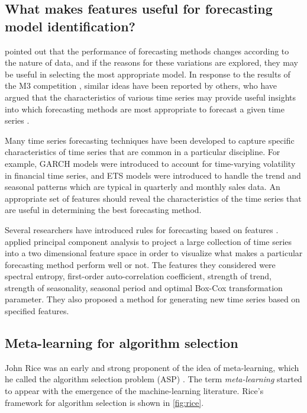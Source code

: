 \documentclass[11pt,a4paper,]{article}
\theoremstyle{definition}
\theoremstyle{definition}
\theoremstyle{definition}
\theoremstyle{remark}
\begin{document}
\subsection{What makes features useful for forecasting model
identification?}\label{what-makes-features-useful-for-forecasting-model-identification}

\textcite{reid1972comparison} pointed out that the performance of
forecasting methods changes according to the nature of data, and if the
reasons for these variations are explored, they may be useful in
selecting the most appropriate model. In response to the results of the
M3 competition \autocite{makridakis2000m3}, similar ideas have been
reported by others, who have argued that the characteristics of various
time series may provide useful insights into which forecasting methods
are most appropriate to forecast a given time series
\autocites{hyndman2001s}{lawrence2001s}{armstrong2001s}.

Many time series forecasting techniques have been developed to capture
specific characteristics of time series that are common in a particular
discipline. For example, GARCH models were introduced to account for
time-varying volatility in financial time series, and ETS models were
introduced to handle the trend and seasonal patterns which are typical
in quarterly and monthly sales data. An appropriate set of features
should reveal the characteristics of the time series that are useful in
determining the best forecasting method.

Several researchers have introduced rules for forecasting based on
features \autocites{collopy1992rule}{adya2001automatic}{wang2009rule}.
\textcite{kang2017visualising} applied principal component analysis to
project a large collection of time series into a two dimensional feature
space in order to visualize what makes a particular forecasting method
perform well or not. The features they considered were spectral entropy,
first-order auto-correlation coefficient, strength of trend, strength of
seasonality, seasonal period and optimal Box-Cox transformation
parameter. They also proposed a method for generating new time series
based on specified features.

\subsection{Meta-learning for algorithm
selection}\label{meta-learning-for-algorithm-selection}

John Rice was an early and strong proponent of the idea of
meta-learning, which he called the algorithm selection problem (ASP)
\autocite{rice1976}. The term \emph{meta-learning} started to appear
with the emergence of the machine-learning literature. Rice's framework
for algorithm selection is shown in \autoref{fig:rice}.
\end{document}
